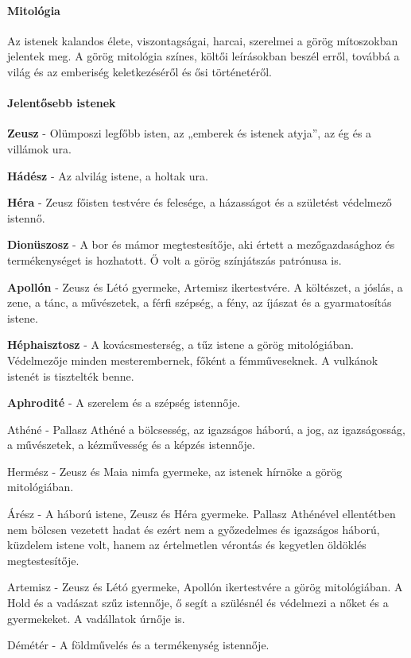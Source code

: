 \paragraph{Mitológia}
Az istenek kalandos élete, viszontagságai, harcai, szerelmei a görög mítoszokban jelentek meg. A görög mitológia színes, költői leírásokban beszél erről, továbbá a világ és az emberiség keletkezéséről és ősi történetéről.

\paragraph{Jelentősebb istenek}
\begin{compactitem}
	\item \textbf{Zeusz} - Olümposzi legfőbb isten, az „emberek és istenek atyja”, az ég és a villámok ura. 
	
	\item \textbf{Hádész} - Az alvilág istene, a holtak ura.
	
	\item \textbf{Héra} -  Zeusz főisten testvére és felesége, a házasságot és a születést védelmező istennő.
	
	\item \textbf{Dionüszosz} - A bor és mámor megtestesítője, aki értett a mezőgazdasághoz és termékenységet is hozhatott. Ő volt a görög színjátszás patrónusa is.
	
	\item \textbf{Apollón} -  Zeusz és Létó gyermeke, Artemisz ikertestvére. A költészet, a jóslás, a zene, a tánc, a művészetek, a férfi szépség, a fény, az íjászat és a gyarmatosítás istene.
	
	\item \textbf{Héphaisztosz} - A kovácsmesterség, a tűz istene a görög mitológiában. Védelmezője minden mesterembernek, főként a fémműveseknek. A vulkánok istenét is tisztelték benne. 
	
	\item \textbf{Aphrodité} - A szerelem és a szépség istennője. 
	
	\item Athéné - Pallasz Athéné a bölcsesség, az igazságos háború, a jog, az igazságosság, a művészetek, a kézművesség és a képzés istennője.
	
	\item Hermész -  Zeusz és Maia nimfa gyermeke, az istenek hírnöke a görög mitológiában.
	
	\item Árész - A háború istene, Zeusz és Héra gyermeke. Pallasz Athénével ellentétben nem bölcsen vezetett hadat és ezért nem a győzedelmes és igazságos háború, küzdelem istene volt, hanem az értelmetlen vérontás és kegyetlen öldöklés megtestesítője.
	
	\item Artemisz -  Zeusz és Létó gyermeke, Apollón ikertestvére a görög mitológiában. A Hold és a vadászat szűz istennője, ő segít a szülésnél és védelmezi a nőket és a gyermekeket. A vadállatok úrnője is.
	
	\item Démétér - A földművelés és a termékenység istennője.
\end{compactitem}

